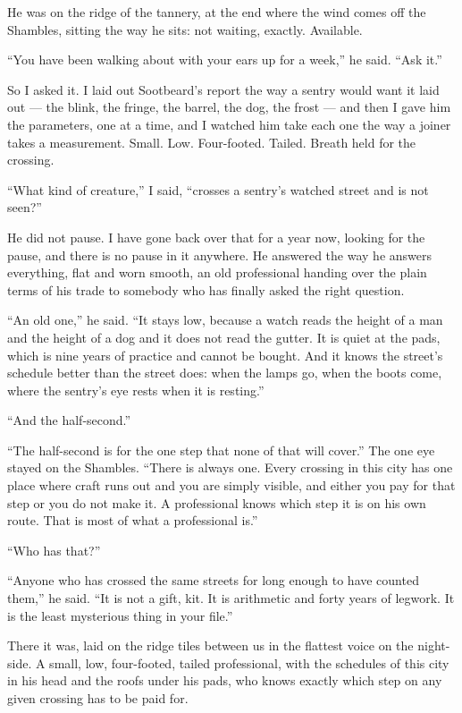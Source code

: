 He was on the ridge of the tannery, at the end where the wind comes off the Shambles, sitting the way he sits: not waiting, exactly. Available.

``You have been walking about with your ears up for a week,'' he said. ``Ask it.''

So I asked it. I laid out Sootbeard's report the way a sentry would want it laid out --- the blink, the fringe, the barrel, the dog, the frost --- and then I gave him the parameters, one at a time, and I watched him take each one the way a joiner takes a measurement. Small. Low. Four-footed. Tailed. Breath held for the crossing.

``What kind of creature,'' I said, ``crosses a sentry's watched street and is not seen?''

He did not pause. I have gone back over that for a year now, looking for the pause, and there is no pause in it anywhere. He answered the way he answers everything, flat and worn smooth, an old professional handing over the plain terms of his trade to somebody who has finally asked the right question.

``An old one,'' he said. ``It stays low, because a watch reads the height of a man and the height of a dog and it does not read the gutter. It is quiet at the pads, which is nine years of practice and cannot be bought. And it knows the street's schedule better than the street does: when the lamps go, when the boots come, where the sentry's eye rests when it is resting.''

``And the half-second.''

``The half-second is for the one step that none of that will cover.'' The one eye stayed on the Shambles. ``There is always one. Every crossing in this city has one place where craft runs out and you are simply visible, and either you pay for that step or you do not make it. A professional knows which step it is on his own route. That is most of what a professional is.''

``Who has that?''

``Anyone who has crossed the same streets for long enough to have counted them,'' he said. ``It is not a gift, kit. It is arithmetic and forty years of legwork. It is the least mysterious thing in your file.''

There it was, laid on the ridge tiles between us in the flattest voice on the night-side. A small, low, four-footed, tailed professional, with the schedules of this city in his head and the roofs under his pads, who knows exactly which step on any given crossing has to be paid for.

